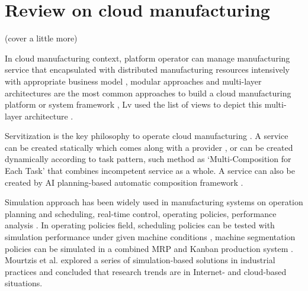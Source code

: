 \section{Review on cloud manufacturing} %
\label{sec:literature_review}
(cover a little more)

In cloud manufacturing context, platform operator can manage  manufacturing service that encapsulated with distributed manufacturing resources intensively with appropriate business model \cite{Xu2012}, modular approaches and multi-layer architectures are the most common approaches to build a cloud manufacturing platform or system framework \cite{Tao2012,Valilai2013}, Lv used the list of views to depict this multi-layer architecture \cite{LvJuly312012-Aug.22012}.

Servitization is the key philosophy to operate cloud manufacturing \cite{li2010cloud}. A  service can be created statically which comes along with a provider \cite{Tao2012}, or can be created dynamically according to task pattern, such method as `Multi-Composition for Each Task' \cite{Liu2013} that combines incompetent service as a whole. A service can also be created by AI planning-based automatic composition framework \cite{OhJan.-March2008}.

Simulation approach has been widely used in manufacturing systems on operation planning and scheduling, real-time control, operating policies, performance analysis \cite{Smith2003}. In operating policies field, scheduling policies can be tested with simulation performance under given machine conditions \cite{Sabuncuoglu2003}, machine
segmentation policies can be simulated in a combined MRP and Kanban production system \cite{Felberbauer9-12Dec.2012}. Mourtzis et al. \cite{Mourtzis2015} explored a series of simulation-based solutions in industrial practices and concluded that research trends are in  Internet- and cloud-based situations.

